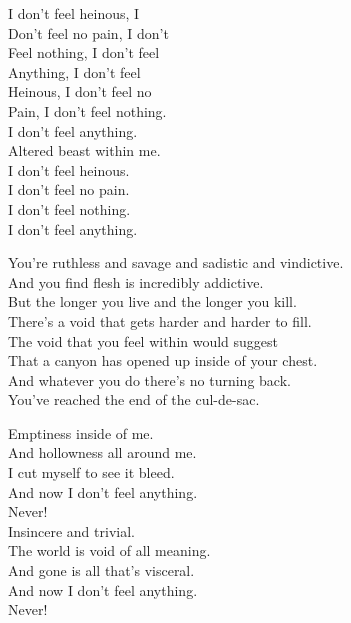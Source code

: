 I don't feel heinous, I \\
Don't feel no pain, I don't \\
Feel nothing, I don't feel \\
Anything, I don't feel \\
Heinous, I don't feel no \\
Pain, I don't feel nothing. \\
I don't feel anything. \\
Altered beast within me. \\

I don't feel heinous. \\
I don't feel no pain. \\
I don't feel nothing. \\
I don't feel anything. \\


You're ruthless and savage and sadistic and vindictive. \\
And you find  flesh is incredibly addictive. \\

But the longer you live and the longer you kill. \\
There's a void that gets harder and harder to fill. \\

The void that you feel within would suggest \\
That a canyon has opened up inside of your chest. \\

And whatever you do there's no turning back. \\
You've reached the end of the cul-de-sac. \\


Emptiness inside of me. \\
And hollowness all around me. \\
I cut myself to see it bleed. \\
And now I don't feel anything. \\
Never! \\

Insincere and trivial. \\
The world is void of all meaning. \\
And gone is all that's visceral. \\
And now I don't feel anything. \\
Never! \\

